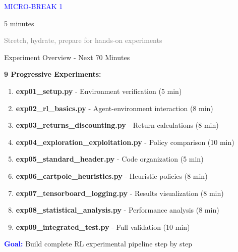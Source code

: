 \documentclass[aspectratio=169,10pt]{beamer}
\begin{document}
\begin{frame}[plain]
\begin{center}
\Huge \textcolor{blue}{MICRO-BREAK 1}

\vfill

\Large 5 minutes

\vfill

\textcolor{gray}{Stretch, hydrate, prepare for hands-on experiments}
\end{center}
\end{frame}

\begin{frame}{Experiment Overview - Next 70 Minutes}

\textbf{9 Progressive Experiments:}

\begin{enumerate}
    \item \textbf{exp01\_setup.py} - Environment verification (5 min)
    \item \textbf{exp02\_rl\_basics.py} - Agent-environment interaction (8 min)
    \item \textbf{exp03\_returns\_discounting.py} - Return calculations (8 min)
    \item \textbf{exp04\_exploration\_exploitation.py} - Policy comparison (10 min)
    \item \textbf{exp05\_standard\_header.py} - Code organization (5 min)
    \item \textbf{exp06\_cartpole\_heuristics.py} - Heuristic policies (8 min)
    \item \textbf{exp07\_tensorboard\_logging.py} - Results visualization (8 min)
    \item \textbf{exp08\_statistical\_analysis.py} - Performance analysis (8 min)
    \item \textbf{exp09\_integrated\_test.py} - Full validation (10 min)
\end{enumerate}

\vfill

\textcolor{blue}{\textbf{Goal:}} Build complete RL experimental pipeline step by step

\end{frame}
\end{document}

